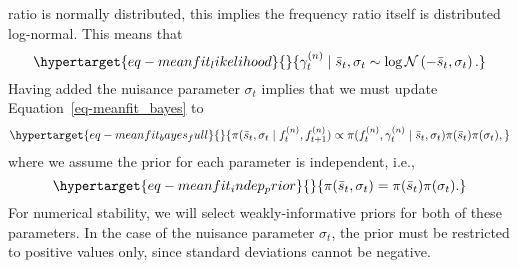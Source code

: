 \documentclass[
  letterpaper,
  DIV=11,
  numbers=noendperiod]{scrartcl}
\begin{document}
\begin{refsegment}
ratio is normally distributed, this implies the frequency ratio itself
is distributed log-normal. This means that
\begin{equation}\protect\hypertarget{eq-meanfit_likelihood}{}{
\gamma_t^{(n)} \mid \bar{s}_t, \sigma_t  \sim 
\log \mathcal{N}\left(-\bar{s}_t, \sigma_t \right).
}\label{eq-meanfit_likelihood}\end{equation} Having added the nuisance
parameter \(\sigma_t\) implies that we must update
Equation~\ref{eq-meanfit_bayes} to
\begin{equation}\protect\hypertarget{eq-meanfit_bayes_full}{}{
\pi(\bar{s}_t, \sigma_t \mid f_t^{(n)}, f_{t+1}^{(n)}) \propto
\pi(f_t^{(n)}, \gamma_t^{(n)} \mid \bar{s}_t, \sigma_t) 
\pi(\bar{s}_t) \pi(\sigma_t),
}\label{eq-meanfit_bayes_full}\end{equation} where we assume the prior
for each parameter is independent, i.e.,
\begin{equation}\protect\hypertarget{eq-meanfit_indep_prior}{}{
\pi(\bar{s}_t, \sigma_t) = \pi(\bar{s}_t) \pi(\sigma_t).
}\label{eq-meanfit_indep_prior}\end{equation} For numerical stability,
we will select weakly-informative priors for both of these parameters.
In the case of the nuisance parameter \(\sigma_t\), the prior must be
restricted to positive values only, since standard deviations cannot be
negative.


\end{refsegment}
\end{document}
